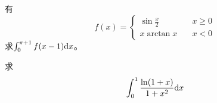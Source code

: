\begin{example}
    有
    \begin{equation*}
        f(x) = \begin{cases}
            \sin\frac{x}{2} &\quad x \ge 0 \\
            x\arctan x &\quad x < 0
        \end{cases}
    \end{equation*}
    求$\int_{0}^{\pi+1}f(x-1)\mathrm{d} x$。                                                            
\end{example}
\begin{solution}
    
\end{solution}

\begin{example}
    求
    \begin{equation*}
        \int_0^1 \frac{\ln(1+x)}{1+x^2} \mathrm{d} x
    \end{equation*}
\end{example}